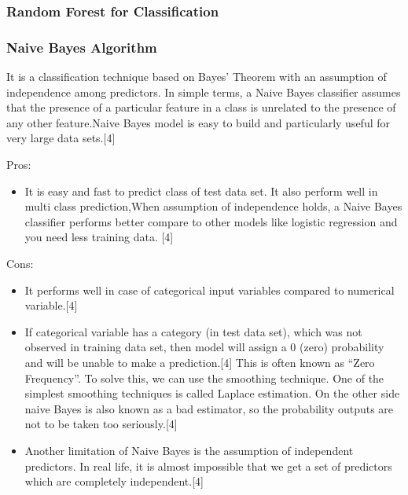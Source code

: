 \documentclass{article}
\begin{document}
\subsubsection {Random Forest for Classification}


\subsubsection {Naive Bayes Algorithm}

It is a classification technique based on Bayes’ Theorem with an assumption of independence among predictors. In simple terms, a Naive Bayes classifier assumes that the presence of a particular feature in a class is unrelated to the presence of any other feature.Naive Bayes model is easy to build and particularly useful for very large data sets.[4] \newline

Pros:
\begin{itemize}
\item It is easy and fast to predict class of test data set. It also perform well in multi class prediction,When assumption of independence holds, a Naive Bayes classifier performs better compare to other models like logistic regression and you need less training data. [4] \newline 
\end{itemize}

Cons:
\begin{itemize}
\item It performs well in case of categorical input variables compared to numerical variable.[4] \newline

\item If categorical variable has a category (in test data set), which was not observed in training data set, then model will assign a 0 (zero) probability and will be unable to make a prediction.[4] This is often known as “Zero Frequency”. To solve this, we can use the smoothing technique. One of the simplest smoothing techniques is called Laplace estimation.
On the other side naive Bayes is also known as a bad estimator, so the probability outputs are not to be taken too seriously.[4] \newline

\item Another limitation of Naive Bayes is the assumption of independent predictors. In real life, it is almost impossible that we get a set of predictors which are completely independent.[4]

\end{itemize}
\end{document}
